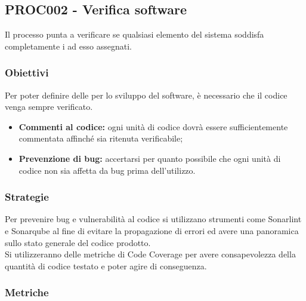 \documentclass[PianoDiQualifica.tex]{subfiles}
\begin{document}
\subsection{PROC002 - Verifica software}
Il processo punta a verificare se qualsiasi elemento del sistema soddisfa completamente i  ad esso assegnati.
\subsubsection{Obiettivi}
Per poter definire delle  per lo sviluppo del software, è necessario che il codice venga sempre verificato.
 \begin{itemize}
 	\item \textbf{Commenti al codice:} ogni unità di codice dovrà essere sufficientemente commentata affinché sia ritenuta verificabile;
 	\item \textbf{Prevenzione di bug:} accertarsi per quanto possibile che ogni unità di codice non sia affetta da bug prima dell'utilizzo.
 \end{itemize}
\subsubsection{Strategie}
Per prevenire bug e vulnerabilità al codice si utilizzano strumenti come Sonarlint e Sonarqube al fine di evitare la propagazione di errori ed avere una panoramica sullo stato generale del codice prodotto.\\
Si utilizzeranno delle metriche di Code Coverage per avere consapevolezza della quantità di codice testato e poter agire di conseguenza.
 
\subsubsection{Metriche}
\end{document}

